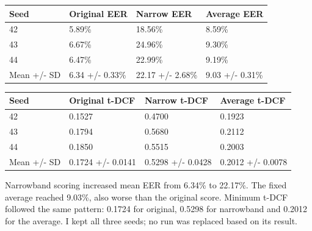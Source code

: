 \documentclass[10pt,a4paper]{article}
\begin{document}
\begin{center}\small

\begin{tabular}{@{}llll@{}}\toprule

Seed & Original EER & Narrow EER & Average EER \\

\midrule

42 & 5.89\% & 18.56\% & 8.59\% \\

43 & 6.67\% & 24.96\% & 9.30\% \\

44 & 6.47\% & 22.99\% & 9.19\% \\

Mean +/- SD & 6.34 +/- 0.33\% & 22.17 +/- 2.68\% & 9.03 +/- 0.31\% \\

\bottomrule\end{tabular}\end{center}

\begin{center}\small

\begin{tabular}{@{}llll@{}}\toprule

Seed & Original t-DCF & Narrow t-DCF & Average t-DCF \\

\midrule

42 & 0.1527 & 0.4700 & 0.1923 \\

43 & 0.1794 & 0.5680 & 0.2112 \\

44 & 0.1850 & 0.5515 & 0.2003 \\

Mean +/- SD & 0.1724 +/- 0.0141 & 0.5298 +/- 0.0428 & 0.2012 +/- 0.0078 \\

\bottomrule\end{tabular}\end{center}

Narrowband scoring increased mean EER from 6.34\% to 22.17\%. The fixed average reached 9.03\%, also worse than the original score. Minimum t-DCF followed the same pattern: 0.1724 for original, 0.5298 for narrowband and 0.2012 for the average. I kept all three seeds; no run was replaced based on its result.\par

\par
\end{document}
